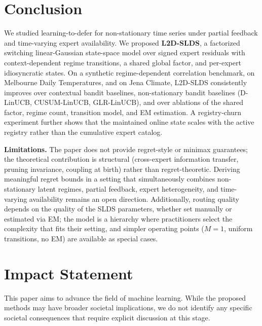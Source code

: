 \section{Conclusion}
We studied learning-to-defer for non-stationary time series under partial feedback and
time-varying expert availability. We proposed \textbf{L2D-SLDS}, a factorized switching
linear-Gaussian state-space model over signed expert residuals with context-dependent regime
transitions, a shared global factor, and per-expert idiosyncratic states. On a synthetic
regime-dependent correlation benchmark, on Melbourne Daily Temperatures, and on Jena Climate,
L2D-SLDS consistently improves over contextual bandit baselines, non-stationary bandit baselines
(D-LinUCB, CUSUM-LinUCB, GLR-LinUCB), and over ablations of the shared factor, regime count,
transition model, and EM estimation. A registry-churn experiment further shows that the maintained
online state scales with the active registry rather than the cumulative expert catalog.

\textbf{Limitations.}
The paper does not provide regret-style or minimax guarantees; the theoretical contribution is
structural (cross-expert information transfer, pruning invariance, coupling at birth) rather than
regret-theoretic. Deriving meaningful regret bounds in a setting that simultaneously combines
non-stationary latent regimes, partial feedback, expert heterogeneity, and time-varying availability
remains an open direction. Additionally, routing quality depends on the quality of the SLDS
parameters, whether set manually or estimated via EM; the model is a hierarchy where practitioners
select the complexity that fits their setting, and simpler operating points (\(M=1\), uniform
transitions, no EM) are available as special cases.


\section{Impact Statement}
This paper aims to advance the field of machine learning. While the proposed methods may have broader societal implications, we do not identify any specific societal consequences that require explicit discussion at this stage.

